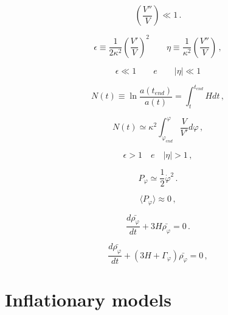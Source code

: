 \begin{equation}
\left( \frac{V''}{V} \right) \ll 1 \, .
\label{equation:2.3.14}
\end{equation}

\begin{equation}
\epsilon \equiv \frac{1}{2 \kappa^2}\left( \frac{V'}{V} \right)^2 \qquad \eta \equiv \frac{1}{\kappa^2} \left( \frac{V''}{V} \right) \, ,
\label{equation:2.3.15}
\end{equation} 

\begin{equation}
\epsilon \ll 1 \qquad e \qquad |\eta| \ll 1
\label{equation:2.3.16} 
\end{equation}   

\begin{equation}
N(t) \equiv \ln \frac{a(t_{end})}{a(t)} = \int_t^{t_{end}} H dt \, ,
\label{equation:2.3.17}
\end{equation}

\begin{equation}
N(t)  \simeq \kappa^2 \int_{\varphi_{end}}^{\varphi} \frac{V}{V'} d\varphi \, ,
\label{equation:2.3.18}
\end{equation}

\begin{equation}
\epsilon > 1 \quad e  \quad | \eta | > 1 \, ,
\label{equation:2.3.19}
\end{equation}

\begin{equation}
P_{\varphi} \simeq \frac{1}{2}\dot{\varphi}^2 \, .
\label{equation:2.3.20}
\end{equation}  

\begin{equation}
\langle P_{\varphi} \rangle \approx 0\, ,
\label{equation:2.3.21}
\end{equation}

\begin{equation}
\dfrac{d \bar{\rho_{\varphi}}}{dt}+3H\bar{\rho_{\varphi}}=0 \, .
\label{equation:2.3.22}
\end{equation}

\begin{equation}
\dfrac{d \bar{\rho_{\varphi}}}{dt}+(3H+\Gamma_{\varphi})\bar{\rho_{\varphi}}=0 \, ,
\label{2.3.23}
\end{equation}

\section{Inflationary models}
\label{section:2.4}

